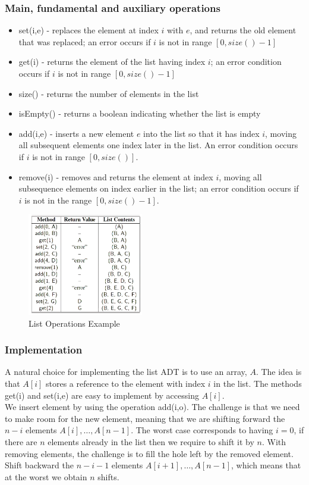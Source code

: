 \documentclass[a4paper]{article}
\theoremstyle{plain}
\theoremstyle{definition}
\theoremstyle{remark}
\begin{document}
\subsubsection{Main, fundamental and auxiliary operations}
\begin{itemize}
	\item set(i,e) - replaces the element at index $i$ with $e$, and returns the old element that was replaced; an error occurs if $i$ is not in range $[0,size\left( \right) -1]$ 
	\item get(i) - returns the element of the list having index $i$; an error condition occurs if $i$ is not in range $[0, size\left(  \right) -1]$
	\item size() - returns the number of elements in the list
	\item isEmpty() - returns a boolean indicating whether the list is empty
	\item add(i,e) - inserts a new element $e$ into the list so that it has index $i$, moving all subsequent elements one index later in the list. An error condition occurs if $i$ is not in range $[0,size\left(  \right) ]$.
	\item remove(i) - removes and returns the element at index $i$, moving all subsequence elements on index earlier in the list; an error condition occurs if $i$ is not in the range $[0,size\left(  \right) -1]$.
\end{itemize}
\begin{figure}[H]
	\centering
	\includegraphics[width=0.45\textwidth]{figures/listadt.png}
	\caption{List Operations Example}
	\label{fig:figures-listadt-png}
\end{figure}
\subsubsection{Implementation}
A natural choice for implementing the list ADT is to use an array, $A$. The idea is that $A[i]$ stores a reference to the element with index $i$ in the list. The methods get(i) and set(i,e) are easy to implement by accessing  $A[i]$. \\
We insert element by using the operation add(i,o). The challenge is that we need to make room for the new element, meaning that we are shifting forward the $n-i$ elements $A[i],\ldots,A[n-1]$. The worst case corresponds to having $i=0$, if there are $n$ elements already in the list then we require to shift it by $n$. With removing elements, the challenge is to fill the hole left by the removed element. Shift backward the $n-i-1$ elements $A[i+1],\ldots,A[n-1]$, which means that at the worst we obtain $n$ shifts.
\end{document}
